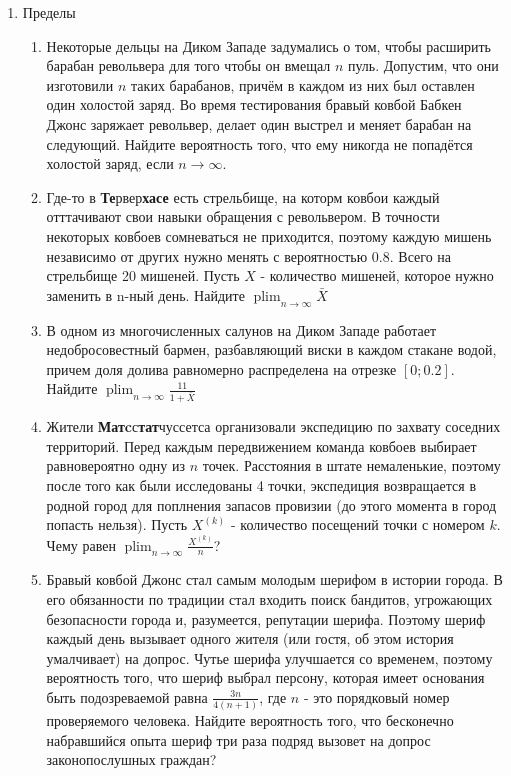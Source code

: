 \documentclass[11pt, a4paper]{article}
\DeclareMathOperator*\plim{plim}
\theoremstyle{definition}
\begin{document}
\begin{enumerate}
    
    
    \item Пределы
\begin{enumerate}
    \item Некоторые дельцы на Диком Западе задумались о том, чтобы расширить барабан револьвера для того чтобы он вмещал $n$ пуль. Допустим, что они изготовили $n$ таких барабанов, причём в каждом из них был оставлен один холостой заряд. Во время тестирования бравый ковбой Бабкен Джонс заряжает револьвер, делает один выстрел и меняет барабан на следующий. Найдите вероятность того, что ему никогда не попадётся холостой заряд, если $n \to \infty$.
    \item Где-то в \textbf{Те}рвер\textbf{хасе} есть стрельбище, на которм ковбои каждый отттачивают свои навыки обращения с револьвером. В точности некоторых ковбоев сомневаться не приходится, поэтому каждую мишень независимо от других нужно менять с вероятностью 0.8. Всего на стрельбище 20 мишеней. Пусть $X$ - количество мишеней, которое нужно заменить в n-ный день. Найдите $\plim_{n \to \infty}{\bar X}$ 
    \item В одном из многочисленных салунов на Диком Западе работает недобросовестный бармен, разбавляющий виски в каждом стакане водой, причем доля долива равномерно распределена на отрезке $[0; 0.2]$. Найдите $\plim_{n \to \infty}{\frac{11}{1+\bar X}}$
    \item Жители \textbf{Матc}с\textbf{тат}чуссетса организовали экспедицию по захвату соседних территорий. Перед каждым передвижением команда ковбоев выбирает равновероятно одну из $n$ точек. Расстояния в штате немаленькие, поэтому после того как были исследованы 4 точки, экспедиция возвращается в родной город для поплнения запасов провизии (до этого момента в город попасть нельзя). Пусть $X^{(k)}$ - количество посещений точки с номером $k$. Чему равен $\plim_{n \to \infty}{\frac{{X^{(k)}}}{n}}$? %
    \item Бравый ковбой Джонс стал самым молодым шерифом в истории города. В его обязанности по традиции стал входить поиск бандитов, угрожающих безопасности города и, разумеется, репутации шерифа. Поэтому шериф каждый день вызывает одного жителя (или гостя, об этом история умалчивает) на допрос. Чутье шерифа улучшается со временем, поэтому вероятность того, что шериф выбрал персону, которая имеет основания быть подозреваемой равна $\frac{3n}{4(n+1)}$, где $n$ - это порядковый номер проверяемого человека. Найдите вероятность того, что бесконечно набравшийся опыта шериф три раза подряд вызовет на допрос законопослушных граждан?

\end{enumerate}
\end{enumerate}
\end{document}
